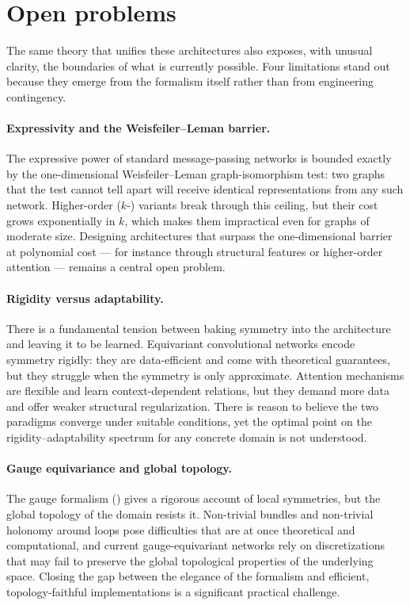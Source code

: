 \section{Open problems}
\label{sec:concl:open}

The same theory that unifies these architectures also exposes, with unusual
clarity, the boundaries of what is currently possible. Four limitations stand out
because they emerge from the formalism itself rather than from engineering
contingency.

\paragraph{Expressivity and the Weisfeiler--Leman barrier.}
The expressive power of standard message-passing networks is bounded exactly by
the one-dimensional Weisfeiler--Leman graph-isomorphism test: two graphs that the
test cannot tell apart will receive identical representations from any such
network. Higher-order ($k$-\WL{}) variants break through this ceiling, but their
cost grows exponentially in $k$, which makes them impractical even for graphs of
moderate size. Designing architectures that surpass the one-dimensional barrier
at polynomial cost --- for instance through structural features or higher-order
attention --- remains a central open problem.

\paragraph{Rigidity versus adaptability.}
There is a fundamental tension between baking symmetry into the architecture and
leaving it to be learned. Equivariant convolutional networks encode symmetry
rigidly: they are data-efficient and come with theoretical guarantees, but they
struggle when the symmetry is only approximate. Attention mechanisms are flexible
and learn context-dependent relations, but they demand more data and offer weaker
structural regularization. There is reason to believe the two paradigms converge
under suitable conditions, yet the optimal point on the rigidity--adaptability
spectrum for any concrete domain is not understood.

\paragraph{Gauge equivariance and global topology.}
The gauge formalism () gives a rigorous account of local
symmetries, but the global topology of the domain resists it. Non-trivial bundles
and non-trivial holonomy around loops pose difficulties that are at once
theoretical and computational, and current gauge-equivariant networks rely on
discretizations that may fail to preserve the global topological properties of
the underlying space. Closing the gap between the elegance of the formalism and
efficient, topology-faithful implementations is a significant practical
challenge.

